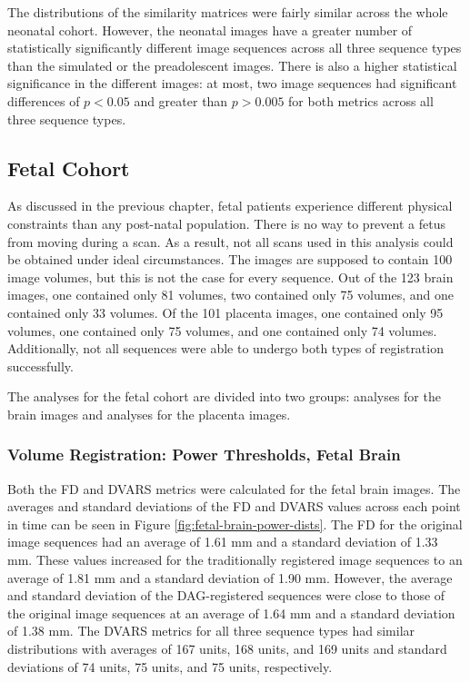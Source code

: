 The distributions of the similarity matrices were fairly similar across the whole neonatal cohort. However, the neonatal images have a greater number of statistically significantly different image sequences across all three sequence types than the simulated or the preadolescent images. There is also a higher statistical significance in the different images: at most, two image sequences had significant differences of $p < 0.05$ and greater than $p > 0.005$ for both metrics across all three sequence types.

\subsection{Fetal Cohort}

As discussed in the previous chapter, fetal patients experience different physical constraints than any post-natal population. There is no way to prevent a fetus from moving during a scan. As a result, not all scans used in this analysis could be obtained under ideal circumstances. The images are supposed to contain 100 image volumes, but this is not the case for every sequence. Out of the 123 brain images, one contained only 81 volumes, two contained only 75 volumes, and one contained only 33 volumes. Of the 101 placenta images, one contained only 95 volumes, one contained only 75 volumes, and one contained only 74 volumes. Additionally, not all sequences were able to undergo both types of registration successfully. 

The analyses for the fetal cohort are divided into two groups: analyses for the brain images and analyses for the placenta images. 

\subsubsection{Volume Registration: Power Thresholds, Fetal Brain}

Both the FD and DVARS metrics were calculated for the fetal brain images. The averages and standard deviations of the FD and DVARS values across each point in time can be seen in Figure \ref{fig:fetal-brain-power-dists}. The FD for the original image sequences had an average of 1.61 mm and a standard deviation of 1.33 mm. These values increased for the traditionally registered image sequences to an average of 1.81 mm and a standard deviation of 1.90 mm. However, the average and standard deviation of the DAG-registered sequences were close to those of the original image sequences at an average of 1.64 mm and a standard deviation of 1.38 mm. The DVARS metrics for all three sequence types had similar distributions with averages of 167 units, 168 units, and 169 units and standard deviations of 74 units, 75 units, and 75 units, respectively.

